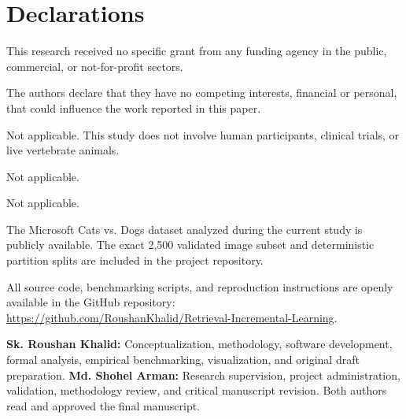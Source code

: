 \documentclass[sn-mathphys,Numbered]{sn-jnl}
\begin{document}
\backmatter

\section*{Declarations}

This research received no specific grant from any funding agency in the public, commercial, or not-for-profit sectors.

The authors declare that they have no competing interests, financial or personal, that could influence the work reported in this paper.

Not applicable. This study does not involve human participants, clinical trials, or live vertebrate animals.

Not applicable.

Not applicable.

The Microsoft Cats vs. Dogs dataset analyzed during the current study is publicly available. The exact 2,500 validated image subset and deterministic partition splits are included in the project repository.

All source code, benchmarking scripts, and reproduction instructions are openly available in the GitHub repository: \url{https://github.com/RoushanKhalid/Retrieval-Incremental-Learning}.

\textbf{Sk. Roushan Khalid:} Conceptualization, methodology, software development, formal analysis, empirical benchmarking, visualization, and original draft preparation. \textbf{Md. Shohel Arman:} Research supervision, project administration, validation, methodology review, and critical manuscript revision. Both authors read and approved the final manuscript.


\end{document}

